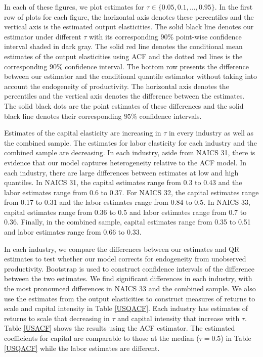 \documentclass[12pt]{article}
\begin{document}
In each of these figures, we plot estimates for $\tau\in\{0.05, 0.1,\dots, 0.95\}$. In the first row of plots for each figure, the horizontal axis denotes these percentiles and the vertical axis is the estimated output elasticities. The solid black line denotes our estimator under different $\tau$ with its corresponding $90\%$ point-wise confidence interval shaded in dark gray. The solid red line denotes the conditional mean estimates of the output elasticities using ACF and the dotted red lines is the corresponding $90\%$ confidence interval. The bottom row presents the difference between our estimator and the conditional quantile estimator without taking into account the endogeneity of productivity. The horizontal axis denotes the percentiles and the vertical axis denotes the difference between the estimates. The solid black dots are the point estimates of these differences and the solid black line denotes their corresponding $95\%$ confidence intervals. 

Estimates of the capital elasticity are increasing in $\tau$ in every industry as well as the combined sample. The estimates for labor elasticity for each industry and the combined sample are decreasing. In each industry, aside from NAICS 31, there is evidence that our model captures heterogeneity relative to the ACF model. In each industry, there are large differences between estimates at low and high quantiles. In NAICS 31, the capital estimates range from 0.3 to 0.43 and the labor estimates range from 0.6 to 0.37. For NAICS 32, the capital estimates range from 0.17 to 0.31 and the labor estimates range from 0.84 to 0.5. In NAICS 33, capital estimates range from 0.36 to 0.5 and labor estimates range from 0.7 to 0.36. Finally, in the combined sample, capital estimates range from 0.35 to 0.51 and labor estimates range from 0.66 to 0.33.

In each industry, we compare the differences between our estimates and QR estimates to test whether our model corrects for endogeneity from unobserved productivity. Bootstrap is used to construct confidence intervals of the difference between the two estimates. We find significant differences in each industry, with the most pronounced differences in NAICS 33 and the combined sample. We also use the estimates from the output elasticities to construct measures of returns to scale and capital intensity in Table \ref{USQACF}. Each industry has estimates of returns to scale that decreasing in $\tau$ and capital intensity that increase with $\tau$. Table \ref{USACF} shows the results using the ACF estimator. The estimated coefficients for capital are comparable to those at the median ($\tau=0.5$) in Table \ref{USQACF} while the labor estimates are different.
\end{document}
